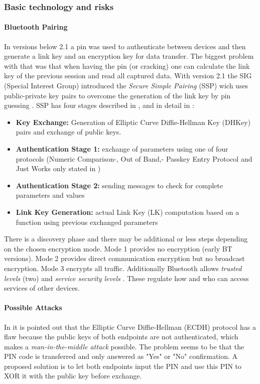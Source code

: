 \documentclass[12pt,a4paper]{article}
\begin{document}
\subsubsection{Basic technology and risks}

\paragraph{Bluetooth Pairing}
In versions below 2.1 a pin was used to authenticate between devices and then generate a link key and an encryption key for data transfer. The biggest problem with that was that when having the pin (or cracking) one can calculate the link key of the previous session and read all captured data. With version 2.1 the SIG (Special Interest Group) introduced the \emph{Secure Simple Pairing} (SSP) wich uses public-private key pairs to overcome the generation of the link key by pin guessing \cite{DBLP:conf/apnoms/FanSL11}. SSP has four stages described in \cite{DBLP:conf/apnoms/FanSL11},  \cite{DBLP:journals/ijnsec/YehPWH12} and in detail in \cite{DBLP:journals/ijnsec/Lackner13} :

\begin{itemize}
	\item \textbf{Key Exchange:} Generation of Elliptic Curve Diffie-Hellman Key (DHKey) pairs and exchange of public keys.
	\item \textbf{Authentication Stage 1:} exchange of parameters using one of four protocols (Numeric Comparison-, Out of Band,- Passkey Entry Protocol and Just Works only stated in \cite{DBLP:journals/ijnsec/Lackner13})
	\item \textbf{Authentication Stage 2:} sending messages to check for complete parameters and values
	\item \textbf{Link Key Generation:} actual Link Key (LK) computation based on a function using previous exchanged parameters
\end{itemize}

There is a discovery phase and there may be additional or less steps depending on the chosen encryption mode. Mode 1 provides no encryption (early BT versions). Mode 2 provides direct communication encryption but no broadcast encryption. Mode 3 encrypts all traffic. Additionally Bluetooth allows \emph{trusted levels} (two) and \emph{service security levels} \cite{DBLP:journals/ijnsec/Lackner13}. These regulate how and who can access services of other devices.

\paragraph{Possible Attacks}
In \cite{DBLP:journals/ijnsec/YehPWH12} it is pointed out that the Elliptic Curve Diffie-Hellman (ECDH) protocol has a flaw because the public keys of both endpoints are not authenticated, which makes a \emph{man-in-the-middle attack} possible. The problem seems to be that the PIN code is transferred and only answered as "Yes" or "No" confirmation. A proposed solution is to let both endpoints input the PIN and use this PIN to XOR it with the public key before exchange.
\end{document}
